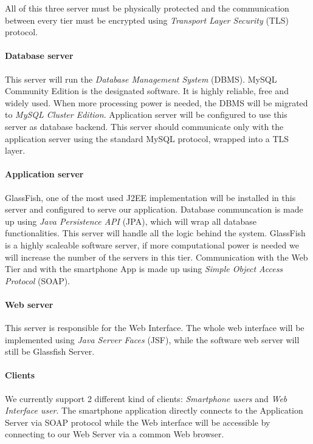 All of this three server must be physically protected and the communication between
every tier must be encrypted using \emph{Transport Layer Security} (TLS) protocol.

\paragraph{Database server} This server will run the \emph{Database Management System}
(DBMS).
MySQL Community Edition is the designated software. It is highly reliable, free
and widely used. When more processing power is needed, the DBMS will be 
migrated to \emph{MySQL Cluster Edition}. Application server will be configured 
to use this server as database backend.
This server should communicate only with the application server using the standard
MySQL protocol, wrapped into a TLS layer.

\paragraph{Application server} GlassFish, one of the most used J2EE implementation
will be installed in this server and configured to serve our application.
Database communcation is made up using \emph{Java Persistence API} (JPA), which will wrap all
database functionalities. This server will handle all the logic behind the system.
GlassFish is a highly scaleable software server, if more computational power 
is needed we will increase the number of the servers in this tier.
Communication with the Web Tier and with the smartphone App is made up using 
\emph{Simple Object Access Protocol} (SOAP).

\paragraph{Web server} This server is responsible for the Web Interface.
The whole web interface will be implemented using \emph{Java Server Faces} (JSF), while 
the software web server will still be Glassfish Server.

\paragraph{Clients}
We currently support 2 different kind of clients: \emph{Smartphone users} and 
\emph{Web Interface user}.
The smartphone application directly connects to the Application Server via SOAP protocol
while the Web interface will be accessible by connecting to our Web Server via
a common Web browser.

